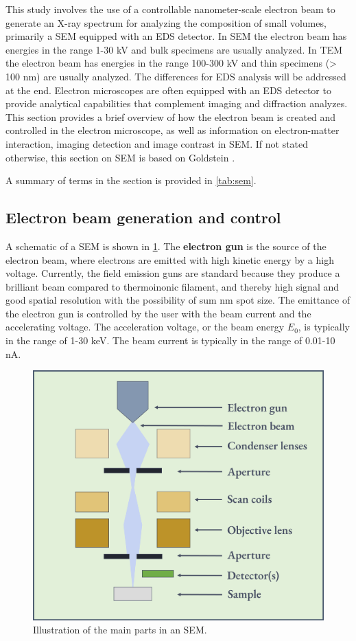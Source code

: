 This study involves the use of a controllable nanometer-scale electron beam to generate an X-ray spectrum for analyzing the composition of small volumes, primarily a SEM equipped with an EDS detector.
In SEM the electron beam has energies in the range 1-30 kV and bulk specimens are usually analyzed.
In TEM the electron beam has energies in the range 100-300 kV and thin specimens (> 100 nm) are usually analyzed.
The differences for EDS analysis will be addressed at the end.
Electron microscopes are often equipped with an EDS detector to provide analytical capabilities that complement imaging and diffraction analyzes.
This section provides a brief overview of how the electron beam is created and controlled in the electron microscope, as well as information on electron-matter interaction, imaging detection and image contrast in SEM.
If not stated otherwise, this section on SEM is based on Goldstein \cite{goldstein_scanning_2018}.

A summary of terms in the section is provided in \cref{tab:sem}.


\subsection{Electron beam generation and control}
\label{theory:sem:setup}

A schematic of a SEM is shown in \cref{fig:SEM_setup}. The \textbf{electron gun} is the source of the electron beam, where electrons are emitted with high kinetic energy by a high voltage.
Currently, the field emission guns are standard because they produce a brilliant beam compared to thermoinonic filament, and thereby high signal and good spatial resolution with the possibility of sum nm spot size.
The emittance of the electron gun is controlled by the user with the beam current and the accelerating voltage.
The acceleration voltage, or the beam energy $E_0$, is typically in the range of 1-30 keV.
The beam current is typically in the range of 0.01-10 nA.


\begin{figure}[ht]
    \centering
    \includegraphics[width=0.8\linewidth]{figures/SEM_setup.png}
    \caption{
        Illustration of the main parts in an SEM.
    }
    \label{fig:SEM_setup}
\end{figure}


